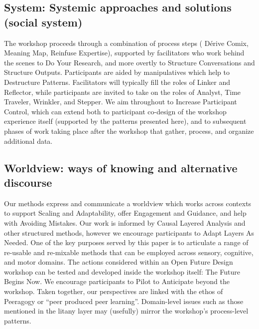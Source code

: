 \documentclass[acmlarge,timestamp]{acmart}
\begin{document}
\subsection{System: Systemic approaches and solutions (social system)}
The workshop proceeds through a combination of process steps ({\sc
  D\'erive Comix}, {\sc Meaning Map}, {\sc Reinfuse Expertise}),
supported by facilitators who work behind the scenes to {\sc Do Your
  Research}, and more overtly to {\sc Structure Conversations} and
{\sc Structure Outputs}.  Participants are aided by manipulatives
which help to {\sc Destructure Patterns}.  Facilitators will typically
fill the roles of {\sc Linker} and {\sc Reflector}, while participants
are invited to take on the roles of {\sc Analyst}, {\sc Time
  Traveler}, {\sc Wrinkler}, and {\sc Stepper}.  We aim throughout to
{\sc Increase Participant Control}, which can extend both to
participant co-design of the workshop experience itself (supported by
the patterns presented here), and to subsequent phases of work taking
place after the workshop that gather, process, and organize additional
data.

\subsection{Worldview: ways of knowing and alternative discourse}
Our methods express and communicate a worldview which works across
contexts to support {\sc Scaling and Adaptability}, offer {\sc
  Engagement and Guidance}, and help with {\sc Avoiding Mistakes}.
Our work is informed by Causal Layered Analysis and other structured
methods, however we encourage participants to {\sc Adapt Layers As
  Needed}.  One of the key purposes served by this paper is to
articulate a range of re-usable and re-mixable methods that can be
employed across sensory, cognitive, and motor domains.  The actions
considered within an Open Future Design workshop can be tested and
developed inside the workshop itself: {\sc The Future Begins Now}. We
encourage participants to {\sc Pilot to Anticipate} beyond the
workshop.  Taken together, our perspectives are linked with the ethos
of Peeragogy or “peer produced peer learning”.  Domain-level issues
such as those mentioned in the litany layer may (usefully) mirror the
workshop’s process-level patterns.
\end{document}
